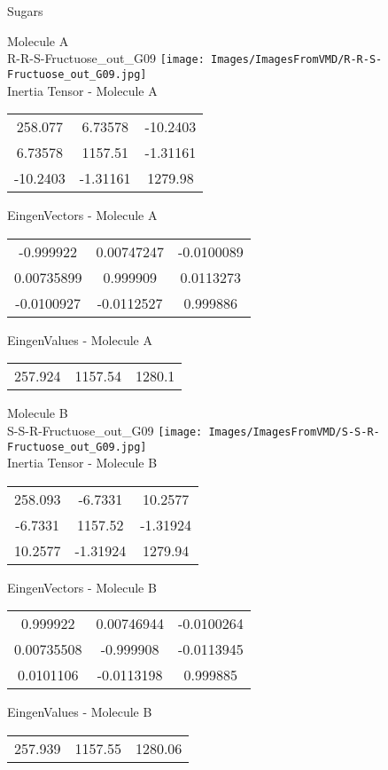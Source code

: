 \vtab[-2cm]
\begin{center}
{\large Sugars}
\end{center}
\begin{multicols}{2}
\begin{center}
Molecule A \\ 
R-R-S-Fructuose\_out\_G09
\texttt{[image: Images/ImagesFromVMD/R-R-S-Fructuose\_out\_G09.jpg]}
\\
Inertia Tensor - Molecule A \\
\vtab
\begin{tabular}{|c c c|}
258.077	 & 	6.73578	 & 	-10.2403	 \\
6.73578	 & 	1157.51	 & 	-1.31161	 \\
-10.2403	 & 	-1.31161	 & 	1279.98
\end{tabular}

\vtab
 EingenVectors - Molecule A     \\
\vtab
\begin{tabular}{|c c c|}
-0.999922	 & 	0.00747247	 & 	-0.0100089	 \\
0.00735899	 & 	0.999909	 & 	0.0113273	 \\
-0.0100927	 & 	-0.0112527	 & 	0.999886
\end{tabular}

\vtab
 EingenValues - Molecule A     \\
\vtab
\begin{tabular}{|c c c|}
257.924	 & 	1157.54	 & 	1280.1
\end{tabular}
\columnbreak

Molecule B \\ 
S-S-R-Fructuose\_out\_G09
\texttt{[image: Images/ImagesFromVMD/S-S-R-Fructuose\_out\_G09.jpg]}
\\
Inertia Tensor - Molecule B \\
\vtab
\begin{tabular}{|c c c|}
258.093	 & 	-6.7331	 & 	10.2577	 \\
-6.7331	 & 	1157.52	 & 	-1.31924	 \\
10.2577	 & 	-1.31924	 & 	1279.94
\end{tabular}

\vtab
 EingenVectors - Molecule B     \\
\vtab
\begin{tabular}{|c c c|}
0.999922	 & 	0.00746944	 & 	-0.0100264	 \\
0.00735508	 & 	-0.999908	 & 	-0.0113945	 \\
0.0101106	 & 	-0.0113198	 & 	0.999885
\end{tabular}

\vtab
 EingenValues - Molecule B     \\
\vtab
\begin{tabular}{|c c c|}
257.939	 & 	1157.55	 & 	1280.06
\end{tabular}

\end{center}
\end{multicols}
